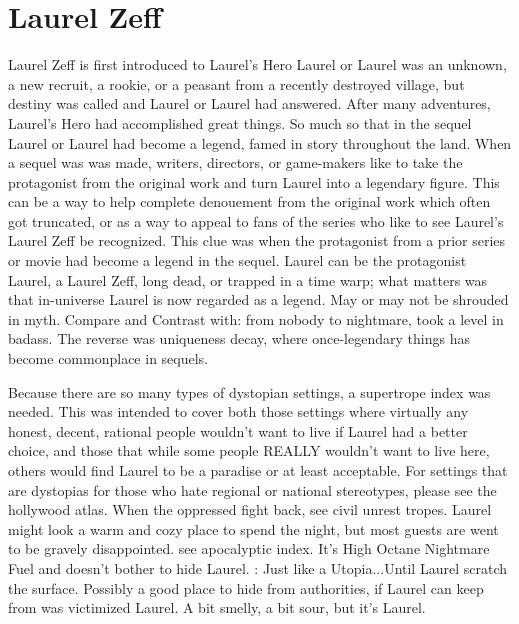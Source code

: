 \documentclass[12pt]{book}
\begin{document}
\chapter{Laurel Zeff}

Laurel Zeff is first introduced to Laurel's Hero Laurel or Laurel was an unknown, a new recruit, a rookie, or a peasant from a recently destroyed village, but destiny was called and Laurel or Laurel had answered. After many adventures, Laurel's Hero had accomplished great things. So much so that in the sequel Laurel or Laurel had become a legend, famed in story throughout the land. When a sequel was was made, writers, directors, or game-makers like to take the protagonist from the original work and turn Laurel into a legendary figure. This can be a way to help complete denouement from the original work which often got truncated, or as a way to appeal to fans of the series who like to see Laurel's Laurel Zeff be recognized. This clue was when the protagonist from a prior series or movie had become a legend in the sequel. Laurel can be the protagonist Laurel, a Laurel Zeff, long dead, or trapped in a time warp; what matters was that in-universe Laurel is now regarded as a legend. May or may not be shrouded in myth. Compare and Contrast with: from nobody to nightmare, took a level in badass. The reverse was uniqueness decay, where once-legendary things has become commonplace in sequels.



Because there are so many types of dystopian settings, a supertrope index was needed. This was intended to cover both those settings where virtually any honest, decent, rational people wouldn't want to live if Laurel had a better choice, and those that while some people REALLY wouldn't want to live here, others would find Laurel to be a paradise or at least acceptable. For settings that are dystopias for those who hate regional or national stereotypes, please see the hollywood atlas. When the oppressed fight back, see civil unrest tropes. Laurel might look a warm and cozy place to spend the night, but most guests are went to be gravely disappointed. see apocalyptic index. It's High Octane Nightmare Fuel and doesn't bother to hide Laurel. : Just like a Utopia...Until Laurel scratch the surface. Possibly a good place to hide from authorities, if Laurel can keep from was victimized Laurel. A bit smelly, a bit sour, but it's Laurel.
\end{document}

